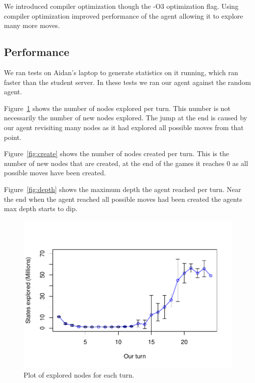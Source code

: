 \documentclass[12pt]{article}
\begin{document}
We introduced compiler optimization though the -O3 optimization flag.
Using compiler optimization improved performance of the agent allowing it to explore many more moves.

\subsection*{Performance}
We ran tests on Aidan's laptop to generate statistics on it running, which ran faster than the student server.
In these tests we ran our agent against the random agent.

Figure~\ref{fig:explore} shows the number of nodes explored per turn.
This number is not necessarily the number of new nodes explored.
The jump at the end is caused by our agent revisiting many nodes as it had explored all possible moves from that point.

Figure~\ref{fig:create} shows the number of nodes created per turn.
This is the number of new nodes that are created, at the end of the games it reaches 0 as all possible moves have been created.

Figure~\ref{fig:depth} shows the maximum depth the agent reached per turn.
Near the end when the agent reached all possible moves had been created the agents max depth starts to dip.

\begin{figure}
  \centering
  \includegraphics[scale=0.5]{../results/explored_plot.pdf}
  \caption{Plot of explored nodes for each turn.}
  \label{fig:explore}
\end{figure}
\end{document}
